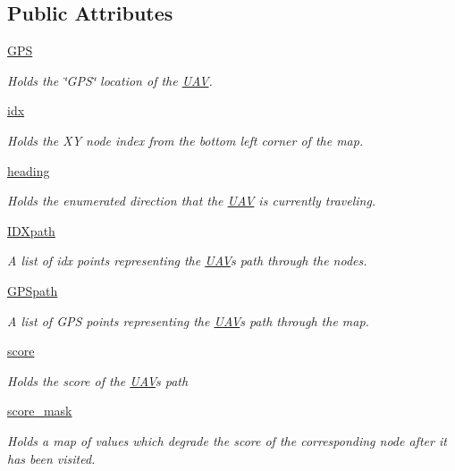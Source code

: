 \subsection*{Public Attributes}
\begin{DoxyCompactItemize}
\item 
\mbox{\hyperlink{classpath_plan_1_1_u_a_v_a759acf47734cd05447afe9e4a3f61307}{G\+PS}}
\begin{DoxyCompactList}\small\item\em Holds the \char`\"{}\+G\+P\+S\char`\"{} location of the \mbox{\hyperlink{classpath_plan_1_1_u_a_v}{U\+AV}}. \end{DoxyCompactList}\item 
\mbox{\hyperlink{classpath_plan_1_1_u_a_v_a8c6578c4b96f4704489038660a4ebe58}{idx}}
\begin{DoxyCompactList}\small\item\em Holds the XY node index from the bottom left corner of the map. \end{DoxyCompactList}\item 
\mbox{\hyperlink{classpath_plan_1_1_u_a_v_ac49fa37a2aaf8fe987f1500069c4f903}{heading}}
\begin{DoxyCompactList}\small\item\em Holds the enumerated direction that the \mbox{\hyperlink{classpath_plan_1_1_u_a_v}{U\+AV}} is currently traveling. \end{DoxyCompactList}\item 
\mbox{\hyperlink{classpath_plan_1_1_u_a_v_a640c0f9f8385d53e0742d9ef5f3a7a59}{I\+D\+Xpath}}
\begin{DoxyCompactList}\small\item\em A list of idx points representing the \mbox{\hyperlink{classpath_plan_1_1_u_a_v}{U\+AV}}\textquotesingle{}s path through the nodes. \end{DoxyCompactList}\item 
\mbox{\hyperlink{classpath_plan_1_1_u_a_v_a1d6d4797e8ac522de0da65ba882b8616}{G\+P\+Spath}}
\begin{DoxyCompactList}\small\item\em A list of G\+PS points representing the \mbox{\hyperlink{classpath_plan_1_1_u_a_v}{U\+AV}}\textquotesingle{}s path through the map. \end{DoxyCompactList}\item 
\mbox{\hyperlink{classpath_plan_1_1_u_a_v_a5f9c3173062f490e98024972e954cb1c}{score}}
\begin{DoxyCompactList}\small\item\em Holds the score of the \mbox{\hyperlink{classpath_plan_1_1_u_a_v}{U\+AV}}\textquotesingle{}s path \end{DoxyCompactList}\item 
\mbox{\hyperlink{classpath_plan_1_1_u_a_v_a998af53f0d27f93e5ad949a09710f995}{score\+\_\+mask}}
\begin{DoxyCompactList}\small\item\em Holds a map of values which degrade the score of the corresponding node after it has been visited. \end{DoxyCompactList}\end{DoxyCompactItemize}


